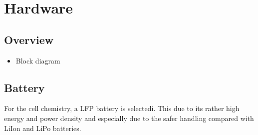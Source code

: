 \section{Hardware}

\FloatBarrier

\subsection{Overview}
\label{sec_hw_overview}
\begin{itemize}
    \item Block diagram
\end{itemize}

\FloatBarrier

\subsection{Battery}
\label{sec_battery}
For the cell chemistry, a \ac{LFP} battery is selectedi. This due to its rather high energy and power density and especially due to the safer handling compared with \ac{LiIon} and \ac{LiPo} batteries.  

